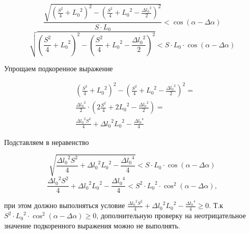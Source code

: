 \documentclass[fleqn,10pt,a4paper]{article}
\begin{document}
\begin{equation*}
	\frac{\sqrt{\left(\frac{S^2}{4}+{L_0}^2\right)^2-\left(\frac{S^2}{4}+{L_0}^2-\frac{{\Delta{}l_0}^2}{2}\right)^2}}{S\cdot{}L_0}
	< \cos\left(\alpha - \Delta\alpha\right)
\end{equation*}
\begin{equation*}
	\sqrt{\left(\frac{S^2}{4}+{L_0}^2\right)^2-\left(\frac{S^2}{4}+{L_0}^2-\frac{{\Delta{}l_0}^2}{2}\right)^2}
	< S\cdot{}L_0\cdot\cos\left(\alpha - \Delta\alpha\right)
\end{equation*}

Упрощаем подкоренное выражение

\begin{equation*}
\begin{split}
	&\left(\frac{S^2}{4}+{L_0}^2\right)^2-\left(\frac{S^2}{4}+{L_0}^2-\frac{{\Delta{}l_0}^2}{2}\right)^2=\\
	&\frac{{\Delta{}l_0}^2}{2}\cdot\left(2\frac{S^2}{4}+2{L_0}^2-\frac{{\Delta{}l_0}^2}{2}\right)=\\
	&\frac{{\Delta{}l_0}^2S^2}{4}+{\Delta{}l_0}^2{L_0}^2-\frac{{\Delta{}l_0}^4}{4}
\end{split}
\end{equation*}

Подставляем в неравенство

\begin{equation*}
	\sqrt{\frac{{\Delta{}l_0}^2S^2}{4}+{\Delta{}l_0}^2{L_0}^2-\frac{{\Delta{}l_0}^4}{4}}
	< S\cdot{}L_0\cdot\cos\left(\alpha - \Delta\alpha\right)
\end{equation*}
\begin{equation*}
	\frac{{\Delta{}l_0}^2S^2}{4}+{\Delta{}l_0}^2{L_0}^2-\frac{{\Delta{}l_0}^4}{4}
	< S^2\cdot{}{L_0}^2\cdot\cos^2\left(\alpha - \Delta\alpha\right),
\end{equation*}

при этом должно выполняться условие
$\frac{{\Delta{}l_0}^2S^2}{4}+{\Delta{}l_0}^2{L_0}^2-\frac{{\Delta{}l_0}^4}{4}\ge
0$. Т.к $S^2\cdot{}{L_0}^2\cdot\cos^2\left(\alpha - \Delta\alpha\right)\ge0$,
дополнительную проверку на неотрицательное значение подкоренного выражения можно
не выполнять.
\end{document}
